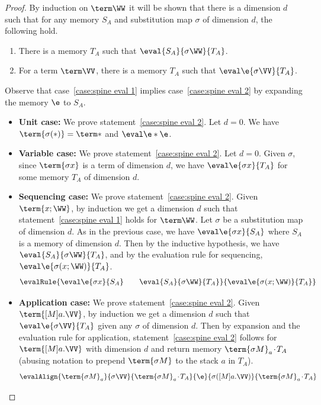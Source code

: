 \documentclass[10pt,a4paper]{amsart}
\newcommand\case[1]{\textbf{#1}}
\newcommand\msep{\kern1pt{\cdot}\kern1pt}
\begin{document}
\spineNFterminate*

\begin{proof}
By induction on $\term\WW$ it will be shown that there is a dimension $d$ such that for any memory $S_A$ and substitution map $\sigma$ of dimension $d$, the following hold.
\begin{enumerate}

\item\label{case:spine eval 1} 
There is a memory $T_A$ such that $\eval{S_A}{\sigma\WW}{T_A}$.

\item\label{case:spine eval 2}
For a term $\term\VV$, there is a memory $T_A$ such that $\eval\e{\sigma\VV}{T_A}$.

\end{enumerate}
Observe that case~\ref{case:spine eval 1} implies case~\ref{case:spine eval 2} by expanding the memory $\e$ to $S_A$.

\begin{itemize}

\item\case{Unit case:}
We prove statement~\ref{case:spine eval 2}. Let $d=0$. We have $\term{\sigma(*)}=\term*$ and $\eval\e*\e$.

\item\case{Variable case:}
We prove statement~\ref{case:spine eval 2}. Let $d=0$. Given $\sigma$, since $\term{\sigma x}$ is a term of dimension $d$, we have $\eval\e{\sigma x}{T_A}$ for some memory $T_A$ of dimension $d$.

\item\case{Sequencing case:}
We prove statement~\ref{case:spine eval 2}. Given $\term{x;\WW}$, by induction we get a dimension $d$ such that statement~\ref{case:spine eval 1} holds for $\term\WW$. Let $\sigma$ be a substitution map of dimension $d$. As in the previous case, we have $\eval\e{\sigma x}{S_A}$ where $S_A$ is a memory of dimension $d$. Then by the inductive hypothesis, we have $\eval {S_A}{\sigma\WW}{T_A}$, and by the evaluation rule for sequencing, $\eval\e{\sigma(x;\WW)}{T_A}$.
\[
\evalRule
    {\eval\e{\sigma x}{S_A} \qquad \eval{S_A}{\sigma\WW}{T_A}}
	{\eval\e{\sigma(x;\WW)}{T_A}} 
\]

\item\case{Application case:}
We prove statement~\ref{case:spine eval 2}. Given $\term{[M]a.\VV}$, by induction we get a dimension $d$ such that $\eval\e{\sigma\VV}{T_A}$ given any $\sigma$ of dimension $d$. Then by expansion and the evaluation rule for application, statement~\ref{case:spine eval 2} follows for $\term{[M]a.\VV}$ with dimension $d$ and return memory $\term{\sigma M}_a\msep T_A$ (abusing notation to prepend $\term{\sigma M}$ to the stack $a$ in $T_A$).
\[
	\evalAlign
	  {\term{\sigma M}_a}       {\sigma\VV}  {\term{\sigma M}_a\msep T_A}
	  {\e}                {\sigma([M]a.\VV)} {\term{\sigma M}_a\msep T_A} 
\]


\end{itemize}
\end{proof}
\end{document}

